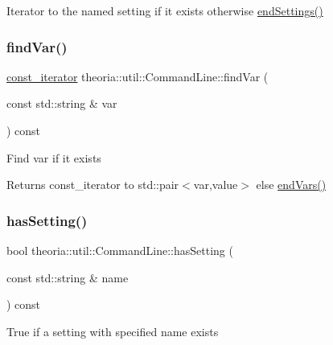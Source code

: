 Iterator to the named setting if it exists otherwise \hyperlink{classtheoria_1_1util_1_1CommandLine_ae33c86c2a60d2470827b2206893c8f7b}{end\+Settings()} \mbox{\label{classtheoria_1_1util_1_1CommandLine_adedd9cbacd108ee1b5454570a200f497}} 
\subsubsection{\texorpdfstring{find\+Var()}{findVar()}}
{\footnotesize\ttfamily \hyperlink{classtheoria_1_1util_1_1CommandLine_a729aa00feedd8257d4caafc73ac6ee63}{const\+\_\+iterator} theoria\+::util\+::\+Command\+Line\+::find\+Var (\begin{DoxyParamCaption}\item[{const std\+::string \&}]{var }\end{DoxyParamCaption}) const\hspace{0.3cm}{\ttfamily [inline]}}

Find var if it exists \begin{DoxyReturn}{Returns}
const\+\_\+iterator to std\+::pair$<$var,value$>$ else \hyperlink{classtheoria_1_1util_1_1CommandLine_add5993c46a68548f70a75b2eb9431558}{end\+Vars()} 
\end{DoxyReturn}
\mbox{\label{classtheoria_1_1util_1_1CommandLine_a011dfbb3035341128a4e4e4f4a466cff}} 
\subsubsection{\texorpdfstring{has\+Setting()}{hasSetting()}}
{\footnotesize\ttfamily bool theoria\+::util\+::\+Command\+Line\+::has\+Setting (\begin{DoxyParamCaption}\item[{const std\+::string \&}]{name }\end{DoxyParamCaption}) const\hspace{0.3cm}{\ttfamily [inline]}}

True if a setting with specified name exists \mbox{\label{classtheoria_1_1util_1_1CommandLine_adb659582b2ce6b2ef9666562ac05bd5f}} 
